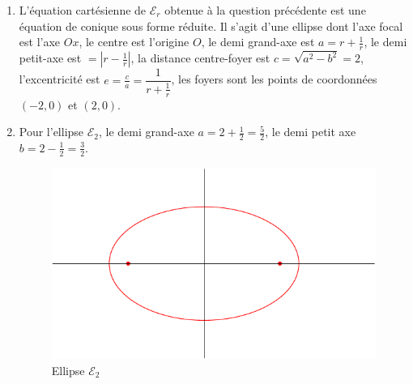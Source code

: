 \begin{enumerate}
\begin{enumerate}
 \item L'équation cartésienne de $\mathcal E_r$ obtenue à la question précédente est une équation de conique sous forme réduite.\newline
Il s'agit d'une ellipse dont l'axe focal est l'axe $Ox$, le centre est l'origine $O$, le demi grand-axe est $a=r+\frac{1}{r}$, le demi petit-axe est $=\left\vert r-\frac{1}{r}\right\vert$, la distance centre-foyer est $c=\sqrt{a^2-b^2}=2$, l'excentricité est $e=\frac{c}{a}=\dfrac{1}{r+\frac{1}{r}}$, les foyers sont les points de coordonnées $(-2,0)$ et $(2,0)$.
 \item Pour l'ellipse $\mathcal E_2$, le demi grand-axe $a=2+\frac{1}{2}=\frac{5}{2}$, le demi petit axe $b=2-\frac{1}{2}=\frac{3}{2}$.
\begin{figure}
 \centering
 \includegraphics{Czuhobo_1.pdf}
 \caption{Ellipse $\mathcal E_2$}
 \label{fig: Czuhobo_1}
\end{figure}
 
\end{enumerate}


\end{enumerate}
